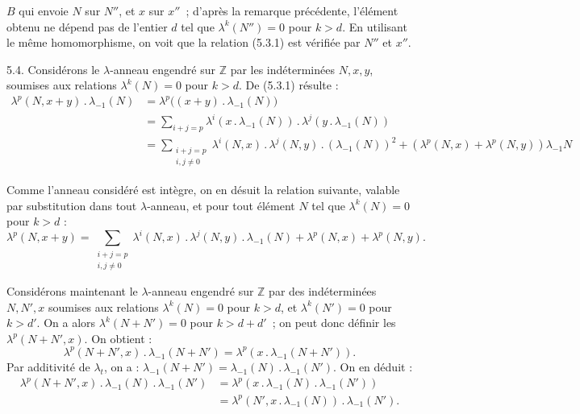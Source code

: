 
\(B\) qui
envoie \(N\) sur \(N''\), et \(x\) sur \(x''\)~; d'après la remarque précédente, l'élément obtenu ne dépend pas de l'entier \(d\) tel que \(\lambda^k(N'')=0\) pour \(k>d\). En utilisant le même homomorphisme, on voit que la relation (5.3.1) est vérifiée par \(N''\) et \(x''\).

5.4. Considérons le \(\lambda\)-anneau engendré sur \(\mathbb Z\) par les indéterminées \(N,x,y\), soumises aux relations \(\lambda^k(N)=0\) pour \(k>d\). De (5.3.1) résulte :
\begin{align*}
  \lambda^p(N,x+y)\mathbin{.}\lambda_{-1}(N)
  &=\lambda^p\bigl((x+y)\mathbin{.}\lambda_{-1}(N)\bigr)\\
  &=\sum_{i+j=p}\lambda^i(x\mathbin{.}\lambda_{-1}(N))\mathbin{.}\lambda^j(y\mathbin{.}\lambda_{-1}(N))\\
  &=\sum_{\substack{i+j=p\\ i,j\ne0}}\lambda^i(N,x)\mathbin{.}\lambda^j(N,y)\mathbin{.}(\lambda_{-1}(N))^2
    +(\lambda^p(N,x)+\lambda^p(N,y))\lambda_{-1}N
\end{align*}

Comme l'anneau considéré est intègre, on en désuit la relation suivante, valable par substitution dans tout \(\lambda\)-anneau, et pour tout élément \(N\) tel que \(\lambda^k(N)=0\) pour \(k>d\) :
\begin{equation}\tag{5.4.1}
  \lambda^p(N,x+y)=\sum_{\substack{i+j=p\\ i,j\ne0}}\lambda^i(N,x)\mathbin{.}\lambda^j(N,y)\mathbin{.}\lambda_{-1}(N)+\lambda^p(N,x)+\lambda^p(N,y).
\end{equation}

Considérons maintenant le \(\lambda\)-anneau engendré sur \(\mathbb Z\) par des indéterminées \(N,N',x\) soumises aux relations \(\lambda^k(N)=0\) pour \(k>d\), et \(\lambda^k(N')=0\) pour \(k>d'\). On a alors \(\lambda^k(N+N')=0\) pour \(k>d+d'\)~; on peut donc définir les \(\lambda^p(N+N',x)\). On obtient :
\[
  \lambda^p(N+N',x)\mathbin{.}\lambda_{-1}(N+N')=\lambda^p(x\mathbin{.}\lambda_{-1}(N+N')).
\]
Par additivité de \(\lambda_t\), on a : \(\lambda_{-1}(N+N')=\lambda_{-1}(N)\mathbin{.}\lambda_{-1}(N')\). On en déduit :
\begin{align*}
  \lambda^p(N+N',x)\mathbin{.}\lambda_{-1}(N)\mathbin{.}\lambda_{-1}(N')
  &=\lambda^p(x\mathbin{.}\lambda_{-1}(N)\mathbin{.}\lambda_{-1}(N'))\\
  &=\lambda^p(N',x\mathbin{.}\lambda_{-1}(N))\mathbin{.}\lambda_{-1}(N').
\end{align*}
